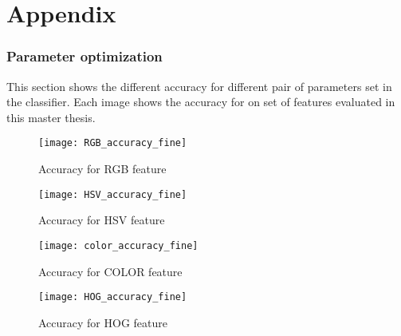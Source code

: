 \renewcommand{\thefigure}{A\arabic{figure}}

\setcounter{figure}{0}

\part*{Appendix}

\section*{Parameter optimization} \label{sec:appendix} 

This section shows the different accuracy for different pair of parameters set in the classifier. Each image shows the accuracy for on set of features evaluated in this master thesis. 

\FloatBarrier
\begin{figure}[!h]
	\begin{minipage}[b]{0.4\textwidth}
		\texttt{[image: RGB\_accuracy\_fine]}
		\caption{Accuracy for RGB feature}
	\end{minipage}
	\hfill
	\begin{minipage}[b]{0.4\textwidth}
		\texttt{[image: HSV\_accuracy\_fine]}
		\caption{Accuracy for HSV feature}
	\end{minipage}
\end{figure}
\FloatBarrier

\FloatBarrier
\begin{figure}[!h]
	\begin{minipage}[b]{0.4\textwidth}
		\texttt{[image: color\_accuracy\_fine]}
		\caption{Accuracy for COLOR feature}
	\end{minipage}
	\hfill
	\begin{minipage}[b]{0.4\textwidth}
		\texttt{[image: HOG\_accuracy\_fine]}
		\caption{Accuracy for HOG feature}
	\end{minipage}
\end{figure}
\FloatBarrier

